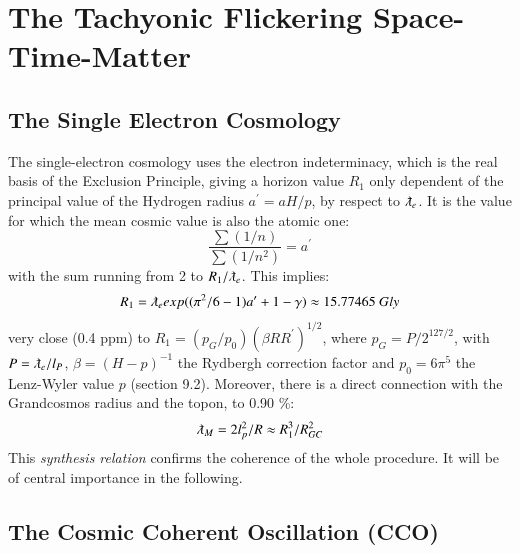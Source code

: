 \documentclass[twoside,draft]{article}
\begin{document}
\begin{sloppypar}
\section{The Tachyonic Flickering Space-Time-Matter}

\subsection{The Single Electron Cosmology}

The single-electron cosmology \cite{Sanchez1} uses the electron indeterminacy, which is the real basis of the Exclusion Principle, giving a horizon value $R_1$ only dependent of the principal value of the Hydrogen radius $a^{\prime} = aH/p$, by respect to $\lambdabar_e$. It is the value for which the mean cosmic value is also the atomic one:
\begin{equation}
\frac{\sum(1/n)}{\sum(1/n^{2})} = a^{\prime}
\end{equation}
with the sum running from 2 to $R_{1} /\lambdabar_{e}$. This implies:
$$
R_{1} = \lambdabar_{e} exp((\pi^{2} /6 - 1)a^{\prime} + 1 - \gamma) \approx 15.77465 ~ Gly
$$
very close (0.4 ppm) to $R_{1} = ( p_{G} /p_{0} )(\beta R R^{\prime})^{1/2}$, where $p_{G} = P/2^{127/2}$, with $P = \lambdabar_e / l_P$, $\beta = (H - p)^{-1}$ the Rydbergh correction factor and $p_{0} = 6\pi^{5}$ the Lenz-Wyler value $p$ (section 9.2). Moreover, there is a direct connection with the Grandcosmos radius and the topon, to 0.90 \%:
\begin{equation}
\lambdabar_M = 2l_p^2/R \approx R_1^3/R_{GC}^2
\end{equation}  
This \textit{synthesis relation} confirms the coherence of the whole procedure. It will be of central importance in the following.

\subsection{The Cosmic Coherent Oscillation (CCO)}


\end{sloppypar}
\end{document}
